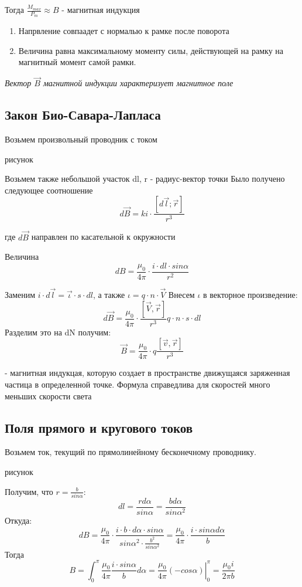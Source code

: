 \documentclass[../main.tex]{subfiles}
\begin{document}
Тогда $\frac{M_{max}}{P_m} \approx B$ - магнитная индукция

\begin{enumerate}
    \item Напрвление совпаадет с нормалью к рамке после поворота
    \item Величина равна максимальному моменту силы, действующей на рамку на магнитный момент самой рамки. 
\end{enumerate}

\textit{Вектор $\vec B$ магнитной индукции характеризует магнитное поле}

\subsection{Закон Био-Савара-Лапласа}
Возьмем произвольный проводник с током

рисунок 

Возьмем также небольшой участок dl, r - радиус-вектор точки
Было получено следующее соотношение 
\[d\vec B = ki \cdot \frac{[d\vec l; \vec r]}{r^3}\]
\begin{center}
    где $d\vec B$ направлен по касательной к окружности
\end{center}
Величина 
\[dB = \frac{\mu_0}{4 \pi} \cdot \frac{i \cdot dl \cdot sin{\alpha}}{r^2}\]

Заменим $i \cdot d \vec l = \vec \iota \cdot s \cdot dl$,  а также $\iota = q \cdot n \cdot \vec V$
Внесем $\iota$ в векторное произведение:
\[d \vec B = \frac{\mu_0}{4\pi} \cdot \frac{[\vec V, \vec r]}{r^3} q \cdot n \cdot s \cdot dl\]
Разделим это на dN получим:
\[ \vec B = \frac{\mu_0}{4 \pi} \cdot q\frac{[\vec v, \vec r]}{r^3}\]
\begin{center}
    - магнитная индукцая, которую создает в пространстве движущаяся заряженная частица в определенной точке. Формула справедлива для скоростей много 
    меньших скорости света
\end{center}

\subsection{Поля прямого и кругового токов}
Возьмем ток, текущий по прямолинейному бесконечному проводнику.

рисунок 

Получим, что $r = \frac{b}{sin{\alpha}}$:
\[dl = \frac{rd\alpha}{sin{\alpha}} = \frac{bd\alpha}{sin{\alpha}^2}\]
Откуда:
\[dB = \frac{\mu_0}{4\pi} \cdot \frac{i \cdot b \cdot d\alpha \cdot sin{\alpha} }{sin{\alpha}^2 \cdot \frac{b^2}{sin{\alpha}^2}} = \frac{\mu_0}{4\pi} \cdot \frac{i \cdot sin{\alpha} d \alpha}{b}\]
Тогда 
\[B = \int_{0}^{\pi} \frac{\mu_0}{4\pi} \frac{i \cdot sin{\alpha}}{b}  d \alpha =  \left. \frac{\mu_0}{4\pi} (- cos{\alpha}) \right|_{0}^{\pi} = \frac{\mu_0 i}{2 \pi b}\] 
\end{document}
